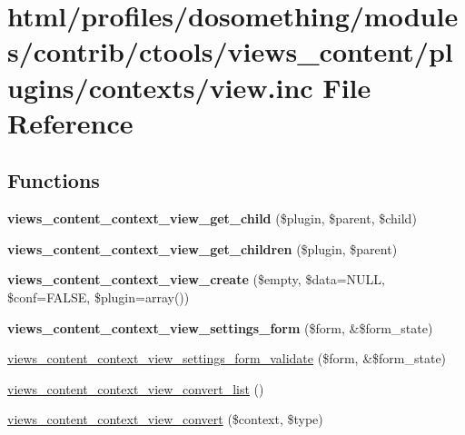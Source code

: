 \hypertarget{ctools_2views__content_2plugins_2contexts_2view_8inc}{
\section{html/profiles/dosomething/modules/contrib/ctools/views\_\-content/plugins/contexts/view.inc File Reference}
\label{ctools_2views__content_2plugins_2contexts_2view_8inc}
}
\subsection*{Functions}
\begin{DoxyCompactItemize}
\item 
\hypertarget{ctools_2views__content_2plugins_2contexts_2view_8inc_aec57121916b9f83a46b4dd1fffcda1c6}{
{\bfseries views\_\-content\_\-context\_\-view\_\-get\_\-child} (\$plugin, \$parent, \$child)}
\label{ctools_2views__content_2plugins_2contexts_2view_8inc_aec57121916b9f83a46b4dd1fffcda1c6}

\item 
\hypertarget{ctools_2views__content_2plugins_2contexts_2view_8inc_a1991c6adf213d866e643a500e3688f85}{
{\bfseries views\_\-content\_\-context\_\-view\_\-get\_\-children} (\$plugin, \$parent)}
\label{ctools_2views__content_2plugins_2contexts_2view_8inc_a1991c6adf213d866e643a500e3688f85}

\item 
\hypertarget{ctools_2views__content_2plugins_2contexts_2view_8inc_a9efaf767f4a200e765e89a6edf3e2002}{
{\bfseries views\_\-content\_\-context\_\-view\_\-create} (\$empty, \$data=NULL, \$conf=FALSE, \$plugin=array())}
\label{ctools_2views__content_2plugins_2contexts_2view_8inc_a9efaf767f4a200e765e89a6edf3e2002}

\item 
\hypertarget{ctools_2views__content_2plugins_2contexts_2view_8inc_a81f16b346429ea8688e6f168ac0376d5}{
{\bfseries views\_\-content\_\-context\_\-view\_\-settings\_\-form} (\$form, \&\$form\_\-state)}
\label{ctools_2views__content_2plugins_2contexts_2view_8inc_a81f16b346429ea8688e6f168ac0376d5}

\item 
\hyperlink{ctools_2views__content_2plugins_2contexts_2view_8inc_a1339d628434bae2b3aa24742e97f6c0b}{views\_\-content\_\-context\_\-view\_\-settings\_\-form\_\-validate} (\$form, \&\$form\_\-state)
\item 
\hyperlink{ctools_2views__content_2plugins_2contexts_2view_8inc_a48f828004c7d6e9a6ac36c06499cf03b}{views\_\-content\_\-context\_\-view\_\-convert\_\-list} ()
\item 
\hyperlink{ctools_2views__content_2plugins_2contexts_2view_8inc_a2aa1b97691e8fdcd7f951ee59f2be6cb}{views\_\-content\_\-context\_\-view\_\-convert} (\$context, \$type)
\end{DoxyCompactItemize}
